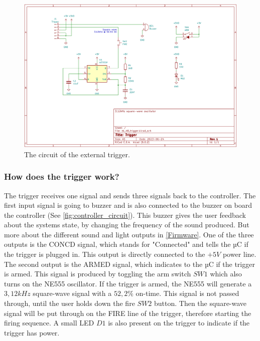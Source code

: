 \begin{figure}[!ht]
    \centering
    \includegraphics[width=15cm]{./Figures/trigger_circuit.png}
    \caption{The circuit of the external trigger.}
    \label{fig:trigger_circuit}     
\end{figure}

\pagebreak

\subsubsection{How does the trigger work?}
The trigger receives one signal and sends three signals back to the controller. The first input signal is going to buzzer and is also connected to the buzzer on board the controller (See \cref{fig:controller_circuit}). This buzzer gives the user feedback about the systems state, by changing the frequency of the sound produced. But more about the different sound and light outputs in \cref{Firmware}. One of the three outputs is the CONCD signal, which stands for "Connected" and tells the µC if the trigger is plugged in. This output is directly connected to the $+5V$ power line. The second output is the ARMED signal, which indicates to the µC if the trigger is armed. This signal is produced by toggling the arm switch $SW1$ which also turns on the NE555 oscillator. If the trigger is armed, the NE555 will generate a $3,12kHz$ square-wave signal with a $52,2\%$ on-time. This signal is not passed through, until the user holds down the fire $SW2$ button. Then the square-wave signal will be put through on the FIRE line of the trigger, therefore starting the firing sequence. A small LED $D1$ is also present on the trigger to indicate if the trigger has power.


